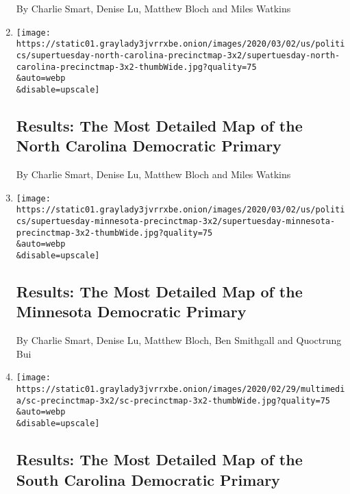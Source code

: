 \begin{enumerate}
  By Charlie Smart, Denise Lu, Matthew Bloch and Miles Watkins
\item
  \href{/interactive/2020/03/03/us/elections/precinct-map-north-carolina-primary.html}{}

  \texttt{[image: https://static01.graylady3jvrrxbe.onion/images/2020/03/02/us/politics/supertuesday-north-carolina-precinctmap-3x2/supertuesday-north-carolina-precinctmap-3x2-thumbWide.jpg?quality=75\\\&auto=webp\\\&disable=upscale]}

  \hypertarget{results-the-most-detailed-map-of-the-north-carolina-democratic-primary}{%
  \subsection{Results: The Most Detailed Map of the North Carolina
  Democratic
  Primary}\label{results-the-most-detailed-map-of-the-north-carolina-democratic-primary}}

  By Charlie Smart, Denise Lu, Matthew Bloch and Miles Watkins
\item
  \href{/interactive/2020/03/03/us/elections/precinct-map-minnesota-primary.html}{}

  \texttt{[image: https://static01.graylady3jvrrxbe.onion/images/2020/03/02/us/politics/supertuesday-minnesota-precinctmap-3x2/supertuesday-minnesota-precinctmap-3x2-thumbWide.jpg?quality=75\\\&auto=webp\\\&disable=upscale]}

  \hypertarget{results-the-most-detailed-map-of-the-minnesota-democratic-primary}{%
  \subsection{Results: The Most Detailed Map of the Minnesota Democratic
  Primary}\label{results-the-most-detailed-map-of-the-minnesota-democratic-primary}}

  By Charlie Smart, Denise Lu, Matthew Bloch, Ben Smithgall and
  Quoctrung Bui
\item
  \href{/interactive/2020/02/29/us/elections/results-south-carolina-primary-precinct-map.html}{}

  \texttt{[image: https://static01.graylady3jvrrxbe.onion/images/2020/02/29/multimedia/sc-precinctmap-3x2/sc-precinctmap-3x2-thumbWide.jpg?quality=75\\\&auto=webp\\\&disable=upscale]}

  \hypertarget{results-the-most-detailed-map-of-the-south-carolina-democratic-primary}{%
  \subsection{Results: The Most Detailed Map of the South Carolina
  Democratic
  Primary}\label{results-the-most-detailed-map-of-the-south-carolina-democratic-primary}}


\end{enumerate}
